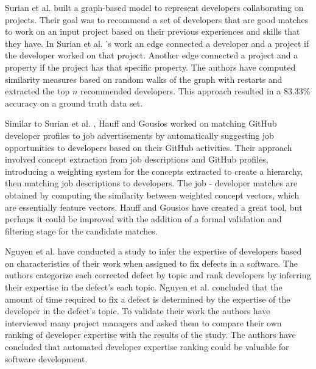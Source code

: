         Surian et al. \cite{surian2011recommending} built a graph-based model to represent developers collaborating on projects. Their goal was to recommend a set of developers that are good matches to work on an input project based on their previous experiences and skills that they have. In Surian et al. \cite{surian2011recommending}'s work an edge connected a developer and a project if the developer worked on that project. Another edge connected a project and a property if the project has that specific property. The authors have computed similarity measures based on random walks of the graph with restarts and extracted the top $n$ recommended developers. This approach resulted in a 83.33\% accuracy on a ground truth data set.
        
        Similar to Surian et al. \cite{surian2011recommending}, Hauff and Gousios \cite{hauff2015matching} worked on matching GitHub developer profiles to job advertisements by automatically suggesting job opportunities to developers based on their GitHub activities. Their approach involved concept extraction from job descriptions and GitHub profiles, introducing a weighting system for the concepts extracted to create a hierarchy, then matching job descriptions to developers. The job - developer matches are obtained by computing the similarity between weighted concept vectors, which are essentially feature vectors. Hauff and Gousios have created a great tool, but perhaps it could be improved with the addition of a formal validation and filtering stage for the candidate matches.

        Nguyen et al. \cite{nguyen2012inferring} have conducted a study to infer the expertise of developers based on characteristics of their work when assigned to fix defects in a software. The authors categorize each corrected defect by topic and rank developers by inferring their expertise in the defect’s each topic. Nguyen et al. concluded that the amount of time required to fix a defect is determined by the expertise of the developer in the defect's topic. To validate their work the authors have interviewed many project managers and asked them to compare their own ranking of developer expertise with the results of the study. The authors have concluded that automated developer expertise ranking could be valuable for software development. 
        

